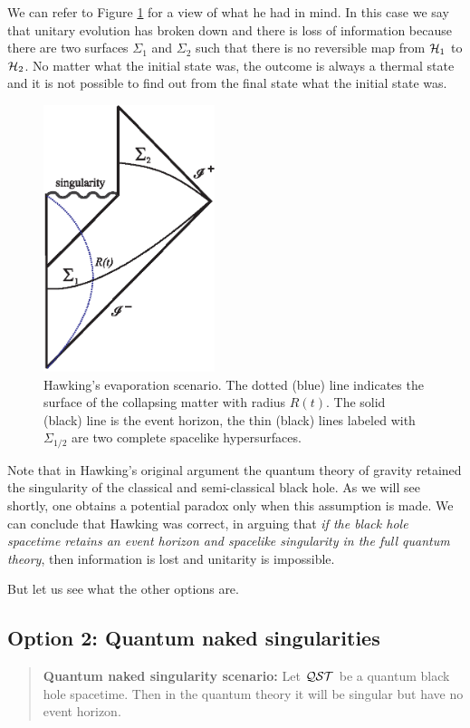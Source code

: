 \documentclass[12pt]{article}
\begin{document}
We can refer to Figure \ref{fig1} for a view of what he had in mind.  In this case we say that unitary evolution has broken down and there is loss of information because there are two surfaces $\Sigma_1$ and $\Sigma_2$ such that there is no reversible map from ${\cal H}_1$ to ${\cal H}_2$.  No matter what the initial state was, the outcome is always a thermal state and it is not possible to find out from the final state what the initial state was.


\begin{figure}[ht]
\centering \includegraphics[width=5cm]{evap2.eps}
\caption{Hawking's evaporation scenario.   The dotted (blue) line indicates
the surface of the collapsing matter with radius $R(t)$. The solid (black) line is the event horizon, the thin (black) lines labeled with $\Sigma_{1/2}$ 
are two complete spacelike hypersurfaces.\label{fig1}}
\end{figure}

Note that in Hawking's original argument the quantum theory of gravity retained the singularity of the 
classical and semi-classical black hole. As we will see shortly, one obtains a potential 
paradox only when this assumption is made.   We can conclude that Hawking was correct, in arguing that {\it if the black hole
spacetime retains an event horizon and spacelike singularity in the full quantum theory}, then information is lost and unitarity is
impossible. 

But let us see what the other options are. 

\subsection*{Option 2: Quantum naked singularities}
\begin{quotation}

{\bf Quantum naked singularity scenario:} Let  ${\cal Q}{\cal S}{\cal T}$ be a quantum  black hole spacetime.  Then in the quantum theory it will be singular but have no event horizon.  

\end{quotation}
\end{document}
